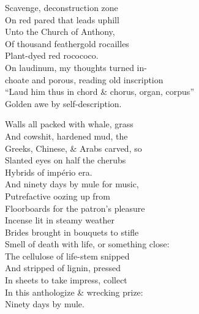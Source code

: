 Scavenge, deconstruction zone \\
On red pared that leads uphill \\
Unto the Church of Anthony, \\
Of thousand feathergold rocailles \\
Plant-dyed red rocococo. \\

On laudinum, my thoughts turned in- \\
\qquad choate and porous, reading old inscription \\
``Laud him thus in chord \& chorus, organ, corpus'' \\
Golden awe by self-description.

Walls all packed with whale, grass \\
And cowshit, hardened mud, the \\
Greeks, Chinese, \& Arabs carved, so \\
Slanted eyes on half the cherubs \\
Hybrids of império era. \\

And ninety days by mule for music, \\
Putrefactive oozing up from \\
Floorboards for the patron's pleasure \\
Incense lit in steamy weather \\
Brides brought in bouquets to stifle \\
Smell of death with life, or something close: \\
The cellulose of life-stem snipped \\
And stripped of lignin, pressed \\
In sheets to take impress, collect \\
In this anthologize \& wrecking prize: \\
Ninety days by mule.